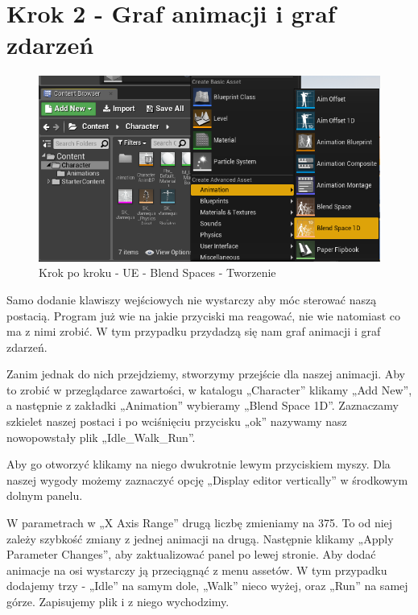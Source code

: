 \documentclass[12pt]{xmgr}
\begin{document}
\newpage
\section{Krok 2 - Graf animacji i graf zdarzeń}

\begin{figure}[!htb]
    \begin{center}
    \includegraphics[scale=0.5]{Screeny/UeKrokPoKroku/UE-BlendSpace-Add.png}
    \end{center}
    \caption{Krok po kroku - UE - Blend Spaces - Tworzenie}
\end{figure}

Samo dodanie klawiszy wejściowych nie wystarczy aby móc sterować naszą postacią. Program już wie na jakie przyciski ma reagować, nie wie natomiast co ma z nimi zrobić. W tym przypadku przydadzą się nam graf animacji i graf zdarzeń.

Zanim jednak do nich przejdziemy, stworzymy przejście dla naszej animacji. Aby to zrobić w przeglądarce zawartości, w katalogu „Character” klikamy „Add New”, a następnie z zakładki „Animation” wybieramy „Blend Space 1D”. Zaznaczamy szkielet naszej postaci i po wciśnięciu przycisku „ok” nazywamy nasz nowopowstały plik „Idle\_Walk\_Run”.

Aby go otworzyć klikamy na niego dwukrotnie lewym przyciskiem myszy. Dla naszej wygody możemy zaznaczyć opcję „Display editor vertically” w środkowym dolnym panelu.

W parametrach w „X Axis Range” drugą liczbę zmieniamy na 375. To od niej zależy szybkość zmiany z jednej animacji na drugą. Następnie klikamy „Apply Parameter Changes”, aby zaktualizować panel po lewej stronie. Aby dodać animacje na osi wystarczy ją przeciągnąć z menu assetów. W tym przypadku dodajemy trzy - „Idle” na samym dole, „Walk” nieco wyżej, oraz „Run” na samej górze. Zapisujemy plik i z niego wychodzimy.
\end{document}
